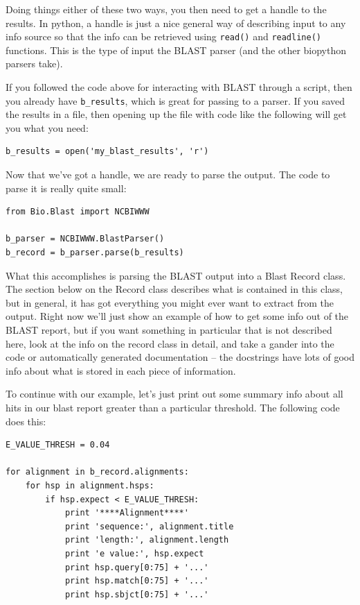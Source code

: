 \documentclass{article}
\begin{document}
Doing things either of these two ways, you then need to get a handle to the results. In python, a handle is just a nice general way of describing input to any info source so that the info can be retrieved using \verb|read()| and \verb|readline()| functions. This is the type of input the BLAST parser (and the other biopython parsers take). 


If you followed the code above for interacting with BLAST through a script, then you already have \verb|b_results|, which is great for passing to a parser. If you saved the results in a file, then opening up the file with code like the following will get you what you need:

\begin{verbatim}
b_results = open('my_blast_results', 'r')
\end{verbatim}


Now that we've got a handle, we are ready to parse the output. The code to parse it is really quite small:

\begin{verbatim}
from Bio.Blast import NCBIWWW

b_parser = NCBIWWW.BlastParser()
b_record = b_parser.parse(b_results)
\end{verbatim}

What this accomplishes is parsing the BLAST output into a Blast Record class. The section below on the Record class describes what is contained in this class, but in general, it has got everything you might ever want to extract from the output. Right now we'll just show an example of how to get some info out of the BLAST report, but if you want something in particular that is not described here, look at the info on the record class in detail, and take a gander into the code or automatically generated documentation -- the docstrings have lots of good info about what is stored in each piece of information.


To continue with our example, let's just print out some summary info about all hits in our blast report greater than a particular threshold. The following code does this:

\begin{verbatim}
E_VALUE_THRESH = 0.04

for alignment in b_record.alignments:
    for hsp in alignment.hsps:
        if hsp.expect < E_VALUE_THRESH:
            print '****Alignment****'
            print 'sequence:', alignment.title
            print 'length:', alignment.length
            print 'e value:', hsp.expect
            print hsp.query[0:75] + '...'
            print hsp.match[0:75] + '...'
            print hsp.sbjct[0:75] + '...'
\end{verbatim}
\end{document}
